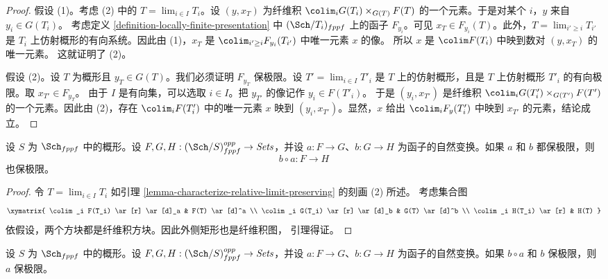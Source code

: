 \begin{proof}
假设 (1)。考虑 (2) 中的 $T = \lim_{i \in I} T_i$。设
$(y, x_T)$ 为纤维积
$\colim_i G(T_i) \times_{G(T)} F(T)$
的一个元素。于是对某个 $i$，$y$ 来自 $y_i \in G(T_i)$。
考虑定义 \ref{definition-locally-finite-presentation} 中
$(\Sch/T_i)_{fppf}$ 上的函子 $F_{y_i}$。可见
$x_T \in F_{y_i}(T)$。此外，$T = \lim_{i' \geq i} T_{i'}$ 是
$T_i$ 上仿射概形的有向系统。因此由 (1)，$x_T$ 是
$\colim_{i' \geq i} F_{y_i}(T_{i'})$ 中唯一元素 $x$ 的像。
所以 $x$ 是 $\colim F(T_i)$ 中映到数对 $(y,x_T)$ 的唯一元素。
这就证明了 (2)。

\medskip\noindent
假设 (2)。设 $T$ 为概形且 $y_T \in G(T)$。我们必须证明 $F_{y_T}$
保极限。设 $T' = \lim_{i \in I} T'_i$ 是 $T$ 上的仿射概形，且是
$T$ 上仿射概形 $T'_i$ 的有向极限。取 $x_{T'} \in F_{y_T}$。
由于 $I$ 是有向集，可以选取 $i \in I$。把 $y_{T'}$ 的像记作
$y_i \in F(T'_i)$。%
于是 $(y_i,x_{T'})$ 是纤维积
$\colim_i G(T'_i) \times_{G(T')} F(T')$
的一个元素。因此由 (2)，存在 $\colim_i F(T'_i)$ 中的唯一元素 $x$
映到 $(y_i,x_{T'})$。显然，$x$ 给出 $\colim_i F_y(T'_i)$ 中映到
$x_{T'}$ 的元素，结论成立。
\end{proof}

\begin{lemma}
\label{lemma-composition-locally-finite-presentation}
设 $S$ 为 $\Sch_{fppf}$ 中的概形。设
$F, G, H : (\Sch/S)_{fppf}^{opp} \to \textit{Sets}$，并设
$a : F \to G$、$b : G \to H$ 为函子的自然变换。如果 $a$ 和 $b$
都保极限，则
$$
b \circ a : F \longrightarrow H
$$
也保极限。
\end{lemma}

\begin{proof}
令 $T = \lim_{i \in I}T_i$ 如引理
\ref{lemma-characterize-relative-limit-preserving} 的刻画 (2) 所述。
考虑集合图
$$
\xymatrix{
\colim_i F(T_i) \ar[r] \ar[d]_a & F(T) \ar[d]^a \\
\colim_i G(T_i) \ar[r] \ar[d]_b & G(T) \ar[d]^b \\
\colim_i H(T_i) \ar[r] & H(T)
}
$$
依假设，两个方块都是纤维积方块。因此外侧矩形也是纤维积图，
引理得证。
\end{proof}

\begin{lemma}
\label{lemma-locally-finite-presentation-permanence}
设 $S$ 为 $\Sch_{fppf}$ 中的概形。设
$F, G, H : (\Sch/S)_{fppf}^{opp} \to \textit{Sets}$，并设
$a : F \to G$、$b : G \to H$ 为函子的自然变换。如果 $b \circ a$
和 $b$ 保极限，则 $a$ 保极限。
\end{lemma}

